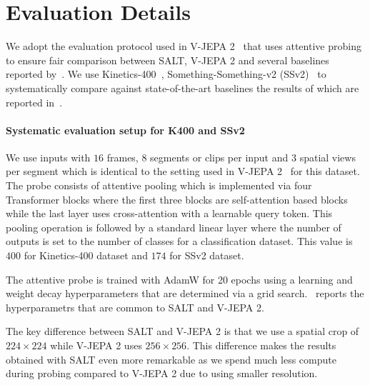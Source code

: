 \documentclass{applemlr}
\numberwithin{equation}{section}
\newcommand{\ourmethod}{SALT\xspace}
\begin{document}
\section{Evaluation Details}
\label{appendix:sec:evals}

We adopt the evaluation protocol used in V-JEPA 2~\citep{assran2025vjepa2} that uses attentive probing to ensure fair comparison between \ourmethod, V-JEPA 2 and several baselines reported by~\citet{assran2025vjepa2}. We use Kinetics-400~\citep{kay2017kinetics}, Something-Something-v2 (SSv2)~\citep{goyal2017something} to systematically compare against state-of-the-art baselines the results of which are reported in~. 

\paragraph{Systematic evaluation setup for K400 and SSv2} We use inputs with $16$ frames, $8$ segments or clips per input and $3$ spatial views per segment which is identical to the setting used in V-JEPA 2~\citep{assran2025vjepa2} for this dataset. The probe consists of attentive pooling which is implemented via four Transformer blocks where the first three blocks are self-attention based blocks while the last layer uses cross-attention with a learnable query token. This pooling operation is followed by a standard linear layer where the number of outputs is set to the number of classes for a classification dataset. This value is $400$ for Kinetics-400 dataset and $174$ for SSv2 dataset. 

The attentive probe is trained with AdamW for 20 epochs using a learning and weight decay hyperparameters that are determined via a grid search.~ reports the hyperparametrs that are common to \ourmethod and V-JEPA 2.

The key difference between \ourmethod and V-JEPA 2 is that we use a spatial crop of $224 \times 224$ while V-JEPA 2 uses $256 \times 256$. This difference makes the results obtained with \ourmethod even more remarkable as we spend much less compute during probing compared to V-JEPA 2 due to using smaller resolution.
\end{document}
